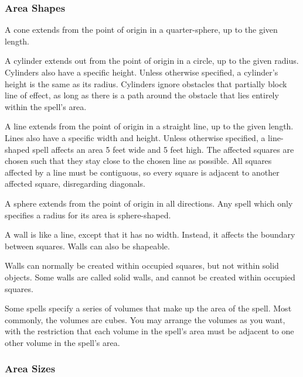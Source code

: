         \subsubsection{Area Shapes}

             A cone extends from the point of origin in a quarter-sphere, up to the given length.

             A cylinder extends out from the point of origin in a circle, up to the given radius.
            Cylinders also have a specific height.
            Unless otherwise specified, a cylinder's height is the same as its radius.
            Cylinders ignore obstacles that partially block line of effect, as long as there is a path around the obstacle that lies entirely within the spell's area.

             A line extends from the point of origin in a straight line, up to the given length.
            Lines also have a specific width and height.
            Unless otherwise specified, a line-shaped spell affects an area 5 feet wide and 5 feet high.
            The affected squares are chosen such that they stay close to the chosen line as possible.
            All squares affected by a line must be contiguous, so every square is adjacent to another affected square, disregarding diagonals.

             A sphere extends from the point of origin in all directions.
            Any spell which only specifies a radius for its area is sphere-shaped.

             A wall is like a line, except that it has no width.
            Instead, it affects the boundary between squares.
            Walls can also be shapeable.

            Walls can normally be created within occupied squares, but not within solid objects.
            Some walls are called solid walls, and cannot be created within occupied squares.

             Some spells specify a series of volumes that make up the area of the spell.
            Most commonly, the volumes are cubes.
            You may arrange the volumes as you want, with the restriction that each volume in the spell's area must be adjacent to one other volume in the spell's area.

        \subsubsection{Area Sizes}

